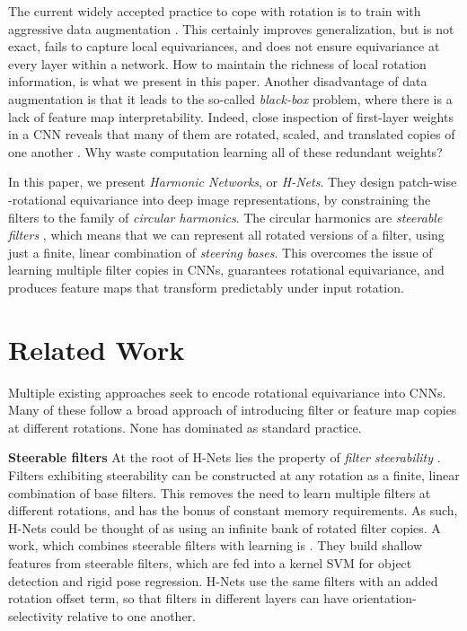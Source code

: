 \documentclass[10pt,twocolumn,letterpaper]{article}
\begin{document}
The current widely accepted practice to cope with rotation is to train with aggressive data augmentation \cite{krizhevsky2012imagenet}. This certainly improves generalization, but is not exact, fails to capture 
local equivariances, and does not ensure equivariance at every
layer within a network. How to maintain the richness of local rotation information, is what we present in this paper. Another disadvantage of data augmentation is that it leads to 
the so-called \emph{black-box} problem, where there is a lack 
of feature map interpretability. Indeed, close inspection of
first-layer weights in a CNN reveals that many of them are rotated,
scaled, and translated copies of one another \cite{zeiler2014understanding}. 
Why waste computation learning all of these redundant weights?





In this paper, we present \emph{Harmonic Networks}, or \emph{H-Nets}.
They design patch-wise -rotational equivariance into 
deep image representations, by constraining the filters to the family 
of \emph{circular harmonics}. The circular harmonics are \emph{steerable 
filters} \cite{freeman1991design}, which means that we can represent 
all rotated versions of a filter, using just a finite, linear combination 
of \emph{steering bases}. This overcomes the issue of learning multiple 
filter copies in CNNs, guarantees rotational equivariance, and produces
feature maps that transform predictably under input rotation.

\section{Related Work}
Multiple existing approaches seek to encode rotational equivariance into
CNNs. Many of these follow a broad approach of introducing filter or
feature map copies at different rotations. None has dominated as standard practice.

\textbf{Steerable filters}
At the root of H-Nets lies the property of \emph{filter steerability} 
\cite{freeman1991design}. Filters exhibiting steerability can be 
constructed at any rotation as a finite, linear combination of base 
filters. This removes the need to learn multiple filters at different 
rotations, and has the bonus of constant memory requirements. As such,
H-Nets could be thought of as using an infinite bank of rotated filter
copies. A work, which combines steerable filters with learning is
\cite{liu2012equi}. They build shallow features from steerable
filters, which are fed into a kernel SVM for object detection and rigid 
pose regression. H-Nets use the same filters with an added rotation offset
term, so that filters in different layers can have orientation-selectivity 
relative to one another. 
\end{document}
